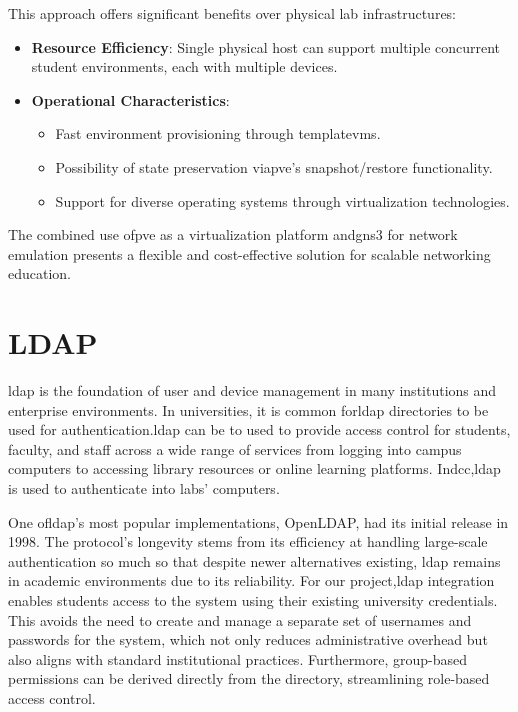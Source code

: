   This approach offers significant benefits over physical lab infrastructures:

  \begin{itemize}
    \item \textbf{Resource Efficiency}: Single physical host can support multiple concurrent student environments, each with multiple devices.
    \item \textbf{Operational Characteristics}:
    \begin{itemize}
        \item Fast environment provisioning through template\ac{vm}s.
        \item Possibility of state preservation via\ac{pve}'s snapshot/restore functionality.
        \item Support for diverse operating systems through virtualization technologies.
    \end{itemize}
  \end{itemize}

  The combined use of\ac{pve} as a virtualization platform and\ac{gns3} for network emulation presents a flexible and cost-effective solution 
  for scalable networking education.

\section{LDAP}

  \ac{ldap} is the foundation of user and device management in many institutions and enterprise environments. In 
  universities, it is common for\ac{ldap} directories to be used for authentication.\ac{ldap} can be to used to 
  provide access control for students, faculty, and staff across a wide range of services from logging into campus 
  computers to accessing library resources or online learning platforms. In\ac{dcc},\ac{ldap} is used to authenticate 
  into labs' computers.

  One of\ac{ldap}'s most popular implementations, OpenLDAP, had its initial release in 1998. The protocol's longevity 
  stems from its efficiency at handling large-scale authentication so much so that despite newer alternatives existing,
  \ac{ldap} remains in academic environments due to its reliability. For our project,\ac{ldap} integration 
  enables students access to the system using their existing university credentials. This avoids the need to create and 
  manage a separate set of usernames and passwords for the system, which not only reduces administrative overhead but 
  also aligns with standard institutional practices. Furthermore, group-based permissions can be derived directly from 
  the directory, streamlining role-based access control.

